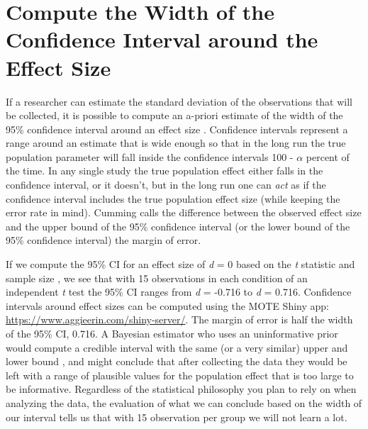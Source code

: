 \documentclass[
  oneside]{krantz}
\begin{document}
\hypertarget{compute-the-width-of-the-confidence-interval-around-the-effect-size}{%
\section{Compute the Width of the Confidence Interval around the Effect Size}\label{compute-the-width-of-the-confidence-interval-around-the-effect-size}}

If a researcher can estimate the standard deviation of the observations that will be collected, it is possible to compute an a-priori estimate of the width of the 95\% confidence interval around an effect size \citep{kelley_confidence_2007}. Confidence intervals represent a range around an estimate that is wide enough so that in the long run the true population parameter will fall inside the confidence intervals 100 - \(\alpha\) percent of the time. In any single study the true population effect either falls in the confidence interval, or it doesn't, but in the long run one can \emph{act} as if the confidence interval includes the true population effect size (while keeping the error rate in mind). Cumming \citeyearpar{cumming_understanding_2013} calls the difference between the observed effect size and the upper bound of the 95\% confidence interval (or the lower bound of the 95\% confidence interval) the margin of error.

If we compute the 95\% CI for an effect size of \emph{d} = 0 based on the \emph{t} statistic and sample size \citep{smithson_confidence_2003}, we see that with 15 observations in each condition of an independent \emph{t} test the 95\% CI ranges from \emph{d} = -0.716 to \emph{d} = 0.716. Confidence intervals around effect sizes can be computed using the MOTE Shiny app: \url{https://www.aggieerin.com/shiny-server/}. The margin of error is half the width of the 95\% CI, 0.716. A Bayesian estimator who uses an uninformative prior would compute a credible interval with the same (or a very similar) upper and lower bound \citep{albers_credible_2018, kruschke_bayesian_2011}, and might conclude that after collecting the data they would be left with a range of plausible values for the population effect that is too large to be informative. Regardless of the statistical philosophy you plan to rely on when analyzing the data, the evaluation of what we can conclude based on the width of our interval tells us that with 15 observation per group we will not learn a lot.
\end{document}
